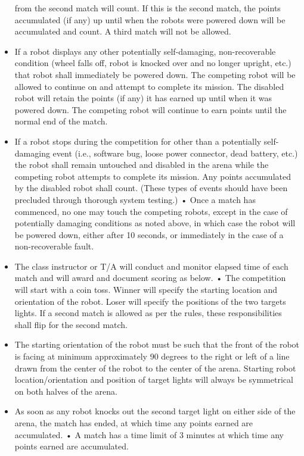 \documentclass{article}
\begin{document}
\begin{itemize}
from the second match will count. If this is the second match, the points accumulated (if any) up until when the robots were powered down will be accumulated and count. A third match will not be allowed.
    \item If a robot displays any other potentially self-damaging, non-recoverable condition (wheel falls off, robot is knocked over and no longer upright, etc.) that robot shall immediately be powered down. The competing robot will be allowed to continue on and attempt to complete its mission. The disabled robot will retain the points (if any) it has earned up until when it was powered down.  The competing robot will continue to earn points until the normal end of the match.
    \item If a robot stops during the competition for other than a potentially self-damaging event (i.e., software bug, loose power connector, dead battery, etc.) the robot shall remain untouched and disabled in the arena while the competing robot attempts to complete its mission.  Any points accumulated by the disabled robot shall count. (These types of events should have been precluded through thorough system testing.) • Once a match has commenced, no one may touch the competing robots, except in the case of potentially damaging conditions as noted above, in which case the robot will be powered down, either after 10 seconds, or immediately in the case of a non-recoverable fault.
    \item The class instructor or T/A will conduct and monitor elapsed time of each match and will award and document scoring as below. • The competition will start with a coin toss.  Winner will specify the starting location and orientation of the robot.  Loser will specify the positions of the two targets lights.  If a second match is allowed as per the rules, these responsibilities shall flip for the second match.
    \item The starting orientation of the robot must be such that the front of the robot is facing at minimum approximately 90 degrees to the right or left of a line drawn from the center of the robot to the center of the arena.  Starting robot location/orientation and position of target lights will always be symmetrical on both halves of the arena.
    \item As soon as any robot knocks out the second target light on either side of the arena, the match has ended, at which time any points earned are accumulated. • A match has a time limit of 3 minutes at which time any points earned are accumulated.

\end{itemize}
\end{document}
